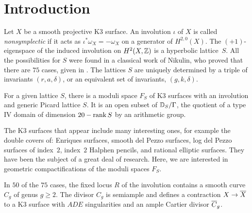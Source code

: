 \documentclass{amsart}
\date{May 11, 2022} \title[Compactifications of moduli spaces of K3 surfaces]%
\author{Valery Alexeev}
\author{Philip Engel}
\newif\ifshort
\begin{document}
 
\begin{abstract}
  There are $75$ moduli spaces $F_S$ of K3 surfaces with a
  nonsymplectic involution. We give detailed descriptions of Kulikov
  models for one-parameter degenerations in $F_S$.
  In the $50$ cases where the fixed locus of
  the involution has a component $C_g$ of genus $g\ge2$, we identify
  normalizations of the KSBA compactifications of $F_S$ via
  stable pairs $(X,\epsilon C_g)$, with explicit semitoroidal
  compactifications of $F_S$.
\end{abstract}

\maketitle 

\ifshort 
\setcounter{tocdepth}{1}
\else
\setcounter{tocdepth}{2}  
\fi

\tableofcontents

\section{Introduction}
\label{sec:intro}

Let $X$ be a smooth projective K3 surface. An involution $\iota$ of
$X$ is called \emph{nonsymplectic} if it acts as
$\iota^*\omega_X = -\omega_X$ on a generator of
$H^{2,0}(X)$.  The $(+1)$-eigenspace of the induced involution
on $H^2(X,{\mathbb Z})$ is a hyperbolic lattice~$S$. All the possibilities for
$S$ were found in a classical work
\cite{nikulin1979integer-symmetric} of Nikulin, who proved that there
are $75$ cases, given in \fign. The lattices $S$ are uniquely
determined by a triple of invariants $(r,a,\delta)$, or an equivalent
set of invariants, $(g,k,\delta)$.

For a given lattice $S$, there is a moduli space $F_S$ of K3 surfaces with
an involution and generic Picard lattice $S$. It is an open subset of
${\mathbb D}_S/\Gamma$, the quotient of a type IV domain of dimension $20-\operatorname{rank} S$
by an arithmetic group.

The K3 surfaces that appear include many interesting ones, for example
the double covers of: Enriques surfaces, smooth del Pezzo surfaces, log
del Pezzo surfaces of index~$2$, index~$2$ Halphen pencils, and rational
elliptic surfaces. They have been the subject of a
great deal of research. Here, we are interested in geometric
compactifications of the moduli spaces $F_S$. 

In $50$ of the $75$ cases, the fixed locus $R$ of the involution
contains a smooth curve $C_g$ of genus $g\ge2$. The divisor $C_g$ is
semiample and defines a contraction $X\to {\overline X}$ to a K3 surface with
$ADE$ singularities and an ample Cartier divisor ${\overline C}_g$.
\end{document}
